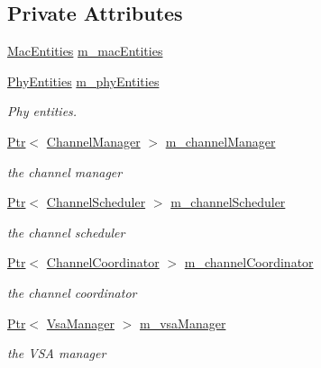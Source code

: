 \subsection*{Private Attributes}
\begin{DoxyCompactItemize}
\item 
\hyperlink{classns3_1_1WaveNetDevice_aa9993b2c252f7ffb8bf802c8f708359d}{Mac\+Entities} \hyperlink{classns3_1_1WaveNetDevice_a6db79f07bf41465f7b91dd38ae81f1e8}{m\+\_\+mac\+Entities}
\item 
\hyperlink{classns3_1_1WaveNetDevice_a3f2285fdbb8db9d733db91e55ebd8b43}{Phy\+Entities} \hyperlink{classns3_1_1WaveNetDevice_a60401868abeed63f3218b78c076534a8}{m\+\_\+phy\+Entities}
\begin{DoxyCompactList}\small\item\em Phy entities. \end{DoxyCompactList}\item 
\hyperlink{classns3_1_1Ptr}{Ptr}$<$ \hyperlink{classns3_1_1ChannelManager}{Channel\+Manager} $>$ \hyperlink{classns3_1_1WaveNetDevice_ae9970c62630b78bc09d4d4a16cb55ff8}{m\+\_\+channel\+Manager}
\begin{DoxyCompactList}\small\item\em the channel manager \end{DoxyCompactList}\item 
\hyperlink{classns3_1_1Ptr}{Ptr}$<$ \hyperlink{classns3_1_1ChannelScheduler}{Channel\+Scheduler} $>$ \hyperlink{classns3_1_1WaveNetDevice_a64edd74de0dc4af431f2d08aad19a9d1}{m\+\_\+channel\+Scheduler}
\begin{DoxyCompactList}\small\item\em the channel scheduler \end{DoxyCompactList}\item 
\hyperlink{classns3_1_1Ptr}{Ptr}$<$ \hyperlink{classns3_1_1ChannelCoordinator}{Channel\+Coordinator} $>$ \hyperlink{classns3_1_1WaveNetDevice_ab05beb5d2cd120f6b81ab100628c1912}{m\+\_\+channel\+Coordinator}
\begin{DoxyCompactList}\small\item\em the channel coordinator \end{DoxyCompactList}\item 
\hyperlink{classns3_1_1Ptr}{Ptr}$<$ \hyperlink{classns3_1_1VsaManager}{Vsa\+Manager} $>$ \hyperlink{classns3_1_1WaveNetDevice_a3bec7791c4e2ffc4609e7bf1b75b07b7}{m\+\_\+vsa\+Manager}
\begin{DoxyCompactList}\small\item\em the V\+SA manager \end{DoxyCompactList}\item 

\end{DoxyCompactItemize}

